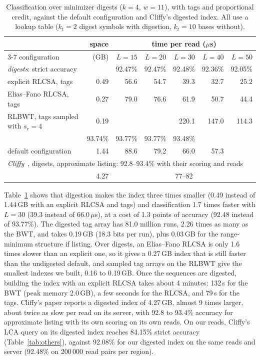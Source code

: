 \begin{table}[t]
\centering
\caption{Classification over minimizer digests ($k = 4$, $w = 11$), with tags and proportional credit, against the default configuration and Cliffy's digested index.
All use a lookup table ($k_t = 2$ digest symbols with digestion, $k_t = 10$ bases without).}
\label{tab:digest}
\small
\begin{tabular}{lrrrrrr}
\toprule
 & space & \multicolumn{5}{c}{time per read ($\mu$s)} \\
\cmidrule{3-7}
configuration & (GB) & $L = 15$ & $L = 20$ & $L = 30$ & $L = 40$ & $L = 50$ \\
\midrule
\multicolumn{2}{l}{\emph{digests}: strict accuracy} & 92.47\% & 92.47\% & 92.48\% & 92.36\% & 92.05\% \\
\quad explicit RLCSA, tags & 0.49 & 56.6 & 54.7 & 39.3 & 32.7 & 25.2 \\
\quad Elias--Fano RLCSA, tags & 0.27 & 79.0 & 76.6 & 61.9 & 50.7 & 44.4 \\
\quad RLBWT, tags sampled with $s_r = 4$ & 0.19 & & & 220.1 & 147.0 & 114.3 \\
\addlinespace
\multicolumn{2}{l}{\emph{undigested}: strict accuracy} & 93.74\% & 93.77\% & 93.77\% & 93.48\% & \\
\quad default configuration & 1.44 & 88.6 & 79.2 & 66.0 & 57.3 & \\
\midrule
\multicolumn{7}{l}{\emph{Cliffy}~\cite{ABL25}, digests, approximate listing: 92.8--93.4\% with their scoring and reads} \\
\quad & 4.27 & \multicolumn{5}{c}{77--82} \\
\bottomrule
\end{tabular}
\end{table}

Table~\ref{tab:digest} shows that digestion makes the index three times smaller (0.49 instead of 1.44\,GB with an explicit RLCSA and tags) and classification 1.7 times faster with $L = 30$ (39.3 instead of 66.0\,$\mu$s), at a cost of 1.3 points of accuracy (92.48 instead of 93.77\%).
The digested tag array has 81.0 million runs, 2.26 times as many as the BWT, and takes 0.19\,GB (18.3 bits per run), plus 0.03\,GB for the range-minimum structure if listing.
Over digests, an Elias--Fano RLCSA is only 1.6 times slower than an explicit one, so it gives a 0.27\,GB index that is still faster than the undigested default, and sampled tag arrays on the RLBWT give the smallest indexes we built, 0.16 to 0.19\,GB.
Once the sequences are digested, building the index with an explicit RLCSA takes about 4 minutes: 132\,s for the BWT (peak memory 2.0\,GB), a few seconds for the RLCSA, and 79\,s for the tags.
Cliffy's paper reports a digested index of 4.27\,GB, almost 9 times larger, about twice as slow per read on its server, with 92.8 to 93.4\% accuracy for approximate listing with its own scoring on its own reads.
On our reads, Cliffy's LCA query on its digested index reaches 84.15\% strict accuracy (Table~\ref{tab:others}), against 92.08\% for our digested index on the same reads and server (92.48\% on 200\,000 read pairs per region).

